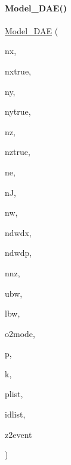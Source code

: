 \paragraph{\texorpdfstring{Model\+\_\+\+D\+A\+E()}{Model\_DAE()}\hspace{0.1cm}{\footnotesize\ttfamily [2/2]}}
{\footnotesize\ttfamily \mbox{\hyperlink{classamici_1_1_model___d_a_e}{Model\+\_\+\+D\+AE}} (\begin{DoxyParamCaption}\item[{const int}]{nx,  }\item[{const int}]{nxtrue,  }\item[{const int}]{ny,  }\item[{const int}]{nytrue,  }\item[{const int}]{nz,  }\item[{const int}]{nztrue,  }\item[{const int}]{ne,  }\item[{const int}]{nJ,  }\item[{const int}]{nw,  }\item[{const int}]{ndwdx,  }\item[{const int}]{ndwdp,  }\item[{const int}]{nnz,  }\item[{const int}]{ubw,  }\item[{const int}]{lbw,  }\item[{const \mbox{\hyperlink{namespaceamici_a2d77779286167d5603a870bf9f6c21ba}{Second\+Order\+Mode}}}]{o2mode,  }\item[{const std\+::vector$<$ \mbox{\hyperlink{namespaceamici_a1bdce28051d6a53868f7ccbf5f2c14a3}{realtype}} $>$}]{p,  }\item[{const std\+::vector$<$ \mbox{\hyperlink{namespaceamici_a1bdce28051d6a53868f7ccbf5f2c14a3}{realtype}} $>$}]{k,  }\item[{const std\+::vector$<$ int $>$}]{plist,  }\item[{const std\+::vector$<$ \mbox{\hyperlink{namespaceamici_a1bdce28051d6a53868f7ccbf5f2c14a3}{realtype}} $>$}]{idlist,  }\item[{const std\+::vector$<$ int $>$}]{z2event }\end{DoxyParamCaption})}

